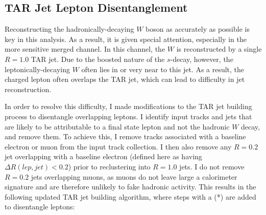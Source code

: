 \subsection{TAR Jet Lepton Disentanglement}
Reconstructing the hadronically-decaying $W$ boson as accurately as possible is key in this analysis. As a result, it is given special attention, especially in the more sensitive merged channel. In this channel, the $W$ is reconstructed by a single $R=1.0$ TAR jet. Due to the boosted nature of the $s$-decay, however, the leptonically-decaying $W$ often lies in or very near to this jet. As a result, the charged lepton often overlaps the TAR jet, which can lead to difficulty in jet reconstruction.

In order to resolve this difficulty, I made modifications to the TAR jet building process to disentangle overlapping leptons. I identify input tracks and jets that are likely to be attributable to a final state lepton and not the hadronic $W$ decay, and remove them. To achieve this, I remove tracks associated with a baseline electron or muon from the input track collection. I then also remove any \akt $R=0.2$ jet overlapping with a baseline electron (defined here as having $\Delta R(lep,jet) < 0.2$) prior to reclustering into $R=1.0$ jets. I do not remove $R=0.2$ jets overlapping muons, as muons do not leave large a calorimeter signature and are therefore unlikely to fake hadronic activity. This results in the following updated TAR jet building algorithm, where steps with a (*) are added to disentangle leptons:

